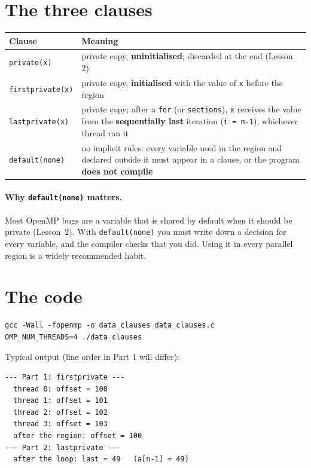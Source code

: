 \documentclass[11pt,a4paper]{article}
\begin{document}
\section{The three clauses}
\begin{center}
\small
\begin{tabular}{@{}>{\raggedright\arraybackslash}p{3.4cm}>{\raggedright\arraybackslash}p{11.8cm}@{}}
\toprule
Clause & Meaning \\ \midrule
\texttt{private(x)} & private copy, \textbf{uninitialised}; discarded at the end (Lesson 2) \\
\texttt{firstprivate(x)} & private copy, \textbf{initialised} with the value of \texttt{x}
  before the region \\
\texttt{lastprivate(x)} & private copy; after a \texttt{for} (or \texttt{sections}),
  \texttt{x} receives the value from the \textbf{sequentially last} iteration
  (\texttt{i = n-1}), whichever thread ran it \\
\texttt{default(none)} & no implicit rules: every variable used in the region and declared
  outside it must appear in a clause, or the program \textbf{does not compile} \\
\bottomrule
\end{tabular}
\end{center}

\paragraph{Why \texttt{default(none)} matters.} Most OpenMP bugs are a variable that is
shared by default when it should be private (Lesson~2). With \texttt{default(none)} you
must write down a decision for every variable, and the compiler checks that you did.
Using it in every parallel region is a widely recommended habit.

\section{The code}


\begin{lstlisting}[style=sh]
gcc -Wall -fopenmp -o data_clauses data_clauses.c
OMP_NUM_THREADS=4 ./data_clauses
\end{lstlisting}
Typical output (line order in Part 1 will differ):
\begin{lstlisting}[style=sh]
--- Part 1: firstprivate ---
  thread 0: offset = 100
  thread 1: offset = 101
  thread 2: offset = 102
  thread 3: offset = 103
  after the region: offset = 100
--- Part 2: lastprivate ---
  after the loop: last = 49   (a[n-1] = 49)
\end{lstlisting}
\end{document}
